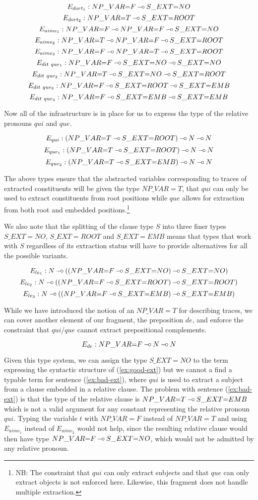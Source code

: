 $$
E_{dort_1} : NP\_VAR{=}F \mathbin{{-}\mkern-3.5mu{\circ}} S\_EXT{=}NO
$$
$$
E_{dort_2} : NP\_VAR{=}T \mathbin{{-}\mkern-3.5mu{\circ}} S\_EXT{=}ROOT
$$
$$
E_{aime_1} : NP\_VAR{=}F \mathbin{{-}\mkern-3.5mu{\circ}} NP\_VAR{=}F \mathbin{{-}\mkern-3.5mu{\circ}} S\_EXT{=}NO
$$
$$
E_{aime_2} : NP\_VAR{=}T \mathbin{{-}\mkern-3.5mu{\circ}} NP\_VAR{=}F \mathbin{{-}\mkern-3.5mu{\circ}} S\_EXT{=}ROOT
$$
$$
E_{aime_3} : NP\_VAR{=}F \mathbin{{-}\mkern-3.5mu{\circ}} NP\_VAR{=}T \mathbin{{-}\mkern-3.5mu{\circ}} S\_EXT{=}ROOT
$$
$$
E_{dit\ que_1} : NP\_VAR{=}F \mathbin{{-}\mkern-3.5mu{\circ}} S\_EXT{=}NO \mathbin{{-}\mkern-3.5mu{\circ}} S\_EXT{=}NO
$$
$$
E_{dit\ que_2} : NP\_VAR{=}T \mathbin{{-}\mkern-3.5mu{\circ}} S\_EXT{=}NO \mathbin{{-}\mkern-3.5mu{\circ}} S\_EXT{=}ROOT
$$
$$
E_{dit\ que_3} : NP\_VAR{=}F \mathbin{{-}\mkern-3.5mu{\circ}} S\_EXT{=}ROOT \mathbin{{-}\mkern-3.5mu{\circ}} S\_EXT{=}EMB
$$
$$
E_{dit\ que_4} : NP\_VAR{=}F \mathbin{{-}\mkern-3.5mu{\circ}} S\_EXT{=}EMB \mathbin{{-}\mkern-3.5mu{\circ}} S\_EXT{=}EMB
$$

Now all of the infrastructure is in place for us to express the type of
the relative pronouns $qui$ and $que$.

$$
E_{qui} : (NP\_VAR{=}T \mathbin{{-}\mkern-3.5mu{\circ}} S\_EXT{=}ROOT) \mathbin{{-}\mkern-3.5mu{\circ}} N \mathbin{{-}\mkern-3.5mu{\circ}} N
$$
$$
E_{que_1} : (NP\_VAR{=}T \mathbin{{-}\mkern-3.5mu{\circ}} S\_EXT{=}ROOT) \mathbin{{-}\mkern-3.5mu{\circ}} N \mathbin{{-}\mkern-3.5mu{\circ}} N
$$
$$
E_{que_2} : (NP\_VAR{=}T \mathbin{{-}\mkern-3.5mu{\circ}} S\_EXT{=}EMB) \mathbin{{-}\mkern-3.5mu{\circ}} N \mathbin{{-}\mkern-3.5mu{\circ}} N
$$

The above types ensure that the abstracted variables corresponding to
traces of extracted constituents will be given the type $NP\_VAR{=}T$,
that $qui$ can only be used to extract constituents from root positions
while $que$ allows for extraction from both root and embedded
positions.\footnote{NB: The constraint that $qui$ can only extract
  subjects and that $que$ can only extract objects is not enforced
  here. Likewise, this fragment does not handle multiple extraction.}

We also note that the splitting of the clause type $S$ into three finer
types $S\_EXT={NO}$, $S\_EXT{=}ROOT$ and $S\_EXT{=}EMB$ means that types
that work with $S$ regardless of its extraction status will have to
provide alternatives for all the possible variants.

$$
E_{le_1} : N \mathbin{{-}\mkern-3.5mu{\circ}} ((NP\_VAR{=}F \mathbin{{-}\mkern-3.5mu{\circ}} S\_EXT{=}NO) \mathbin{{-}\mkern-3.5mu{\circ}} S\_EXT{=}NO)
$$
$$
E_{le_2} : N \mathbin{{-}\mkern-3.5mu{\circ}} ((NP\_VAR{=}F \mathbin{{-}\mkern-3.5mu{\circ}} S\_EXT{=}ROOT) \mathbin{{-}\mkern-3.5mu{\circ}} S\_EXT{=}ROOT)
$$
$$
E_{le_3} : N \mathbin{{-}\mkern-3.5mu{\circ}} ((NP\_VAR{=}F \mathbin{{-}\mkern-3.5mu{\circ}} S\_EXT{=}EMB) \mathbin{{-}\mkern-3.5mu{\circ}} S\_EXT{=}EMB)
$$

While we have introduced the notion of an $NP\_VAR{=}T$ for describing
traces, we can cover another element of our fragment, the preposition
$de$, and enforce the constraint that $qui$/$que$ cannot extract
prepositional complements.

$$
E_{de} : NP\_VAR{=}F \mathbin{{-}\mkern-3.5mu{\circ}} N \mathbin{{-}\mkern-3.5mu{\circ}} N
$$

Given this type system, we can assign the type $S\_EXT{=}NO$ to the term
expressing the syntactic structure of (\ref{ex:good-ext}) but we cannot
a find a typable term for sentence (\ref{ex:bad-ext}), where $qui$ is
used to extract a subject from a clause embedded in a relative clause.
The problem with sentence (\ref{ex:bad-ext}) is that the type of the
relative clause is $NP\_VAR{=}T \mathbin{{-}\mkern-3.5mu{\circ}} S\_EXT{=}EMB$ which is not a valid
argument for any constant representing the relative pronoun
$qui$. Typing the variable $t$ with $NP\_VAR{=}F$ instead of
$NP\_VAR{=}T$ and using $E_{aime_1}$ instead of $E_{aime_2}$ would not
help, since the resulting relative clause would then have type
$NP\_VAR{=}F \mathbin{{-}\mkern-3.5mu{\circ}} S\_EXT{=}NO$, which would not be admitted by any
relative pronoun.

